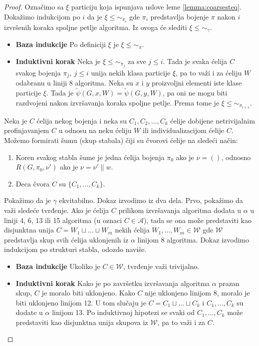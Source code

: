 \documentclass[12pt,oneside]{memoir}
\theoremstyle{definition}
\begin{document}
  \begin{proof}

	  Označimo sa $\xi$ particiju koja ispunjava uslove leme
	  \ref{lemma:coarsesteq}. Dokažimo indukcijom po $i$ da je $\xi \leq
	  \sim_{\pi_i}$ gde $\pi_i$ predstavlja bojenje $\pi$ nakon $i$ izvršenih
	  koraka spoljne petlje algoritma. Iz ovoga će slediti $\xi \leq \sim_\gamma$.

	  \begin{itemize}
		  \item[] \textbf{Baza indukcije} Po definiciji $\xi$ je $\xi \leq \sim_{\pi}$.
		  \item[] \textbf{Induktivni korak} Neka je $\xi \leq \sim_{\pi_j}$ za sve $ j \leq i$.
			  Tada je svaka ćelija $C$ svakog bojenja $\pi_j,\ j \leq i$ unija nekih
			  klasa particije $\xi$, pa to važi i za ćeliju $W$ odabranu u
			  liniji 8 algoritma.  Neka su $x$ i $y$ proizvoljni elementi iste klase
			  particije $\xi$. Tada je $\widetilde{\psi}(G, x, W) = \widetilde{\psi}(G, y, W)$, pa oni ne
			  mogu biti razdvojeni nakon izvršavanja koraka spoljne petlje.
			  Prema tome je $\xi \leq \sim_{\pi_{i+1}}$.
	  \end{itemize}

	  Neka je $C$ ćelija nekog bojenja i neka su $C_1, C_2, \dots, C_k$ ćelije
	  dobijene netrivijalnim profinjavanjem $C$ u odnosu na neku ćeliju $W$ ili
	  individualizacijom ćelije $C$. Možemo formirati šumu (skup stabala) čiji
	  su čvorovi ćelije na sledeći način:
	  \begin{enumerate}
		  \item Koren svakog stabla šume je jedna ćelija bojenja $\pi_0$ ako je
			  $\nu = ()$, odnosno $R(G, \pi_0, \nu')$ ako je $\nu = \nu' \| w$.
		  \item Deca čvora $C$ su $\{C_1, \dots, C_k\}$.
	  \end{enumerate}

	  Pokažimo da je $\gamma$ ekvitabilno. Dokaz izvodimo iz dva dela. Prvo,
	  pokažimo da važi sledeće tvrđenje. Ako je ćelija $C$ prilikom izvršavanja
	  algoritma dodata u $\alpha$ u liniji 4, 6, 13 ili 15 algoritma (u oznaci
	  $C \in \mathcal{A}$), tada se ona može predstaviti kao disjunktna unija
	  $C = W_1 \sqcup \dots \sqcup W_m$ nekih ćelija $W_1, \dots, W_m \in
	  \mathcal{W}$ gde $\mathcal{W}$ predstavlja skup svih ćelija uklonjenih iz
	  $\alpha$ linijom 8 algoritma.  Dokaz izvodimo indukcijom po strukturi
	  stabla, odozdo naviše.

	  \begin{itemize}
		  \item[] \textbf{Baza indukcije} Ukoliko je $C \in \mathcal{W}$,
			  tvrđenje važi trivijalno.
		  \item[] \textbf{Induktivni korak} Kako je po završetku izvršavanja
			  algoritma $\alpha$ prazan skup, $C$ je moralo biti uklonjeno.
			  Kako $C$ nije uklonjeno linijom 8, moralo je biti uklonjeno
			  linijom 12. U tom slučaju je $C = C_1 \sqcup \dots \sqcup C_k$ i
			  $C_1, \dots, C_k$ su dodate u $\alpha$ linijom 13. Po induktivnoj
			  hipotezi se svaki od $C_1, \dots, C_k$ može predstaviti kao
			  disjunktna unija skupova iz $\mathcal{W}$, pa to važi i za $C$.
	  \end{itemize}


\end{proof}
\end{document}
